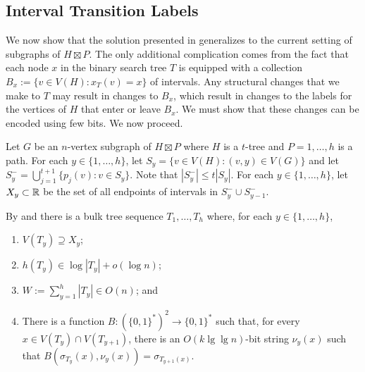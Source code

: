 \documentclass[kpfonts]{patmorin}
\let\le\leqslant
\begin{document}
\subsection{Interval Transition Labels}


We now show that the solution presented in  generalizes to the current setting of subgraphs of $H\boxtimes P$.  The only additional complication comes from the fact that each node $x$ in the binary search tree $T$ is equipped with a collection $B_x:=\{v\in V(H):x_T(v)=x\}$ of intervals.  Any structural changes that we make to $T$ may result in changes to $B_x$, which result in changes to the labels for the vertices of $H$ that enter or leave $B_x$.  We must show that these changes can be encoded using few bits.  We now proceed.

Let $G$ be an $n$-vertex subgraph of $H\boxtimes P$ where $H$ is a $t$-tree and $P=1,\ldots,h$ is a path. For each $y\in\{1,\ldots,h\}$, let $S_y=\{v\in V(H): (v,y)\in V(G)\}$ and let $S^-_y=\bigcup_{j=1}^{t+1}\{p_j(v):v\in S_y\}$.  Note that $|S^-_y|\le t|S_y|$. For each $y\in\{1,\ldots,h\}$, let $X_y\subset\mathbb{R}$ be the set of all endpoints of intervals in $S^-_y\cup S^-_{y-1}$.

By  and  there is a bulk tree sequence $T_1,\ldots,T_h$ where, for each $y\in\{1,\ldots,h\}$, 
\begin{enumerate}[(PR1)]
  \item $V(T_y)\supseteq X_y$;
  \item $h(T_y)\in \log |T_y| + o(\log n)$;
  \item $W:=\sum_{y=1}^h |T_y|\in O(n)$; and
  \item There is a function $B:(\{0,1\}^*)^2\to\{0,1\}^*$ such that, for every $x\in V(T_y)\cap V(T_{y+1})$, there is an $O(k\lg\lg n)$-bit string $\nu_y(x)$ such that $B(\sigma_{T_y}(x),\nu_y(x))=\sigma_{T_{y+1}(x)}$.
\end{enumerate}
\end{document}
